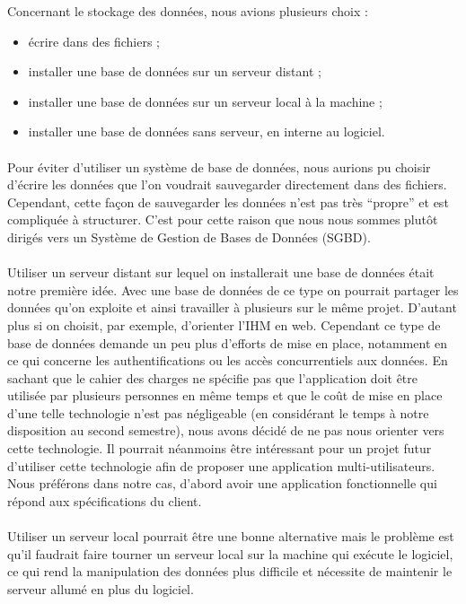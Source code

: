 Concernant le stockage des données, nous avions plusieurs choix :
\begin{itemize}
\item écrire dans des fichiers ;
\item installer une base de données sur un serveur distant ;
\item installer une base de données sur un serveur local à la machine ;
\item installer une base de données sans serveur, en interne au logiciel.
\end{itemize}

\paragraph{}
Pour éviter d’utiliser un système de base de données, nous aurions pu choisir
d’écrire les données que l’on voudrait sauvegarder directement dans des
fichiers. Cependant, cette façon de sauvegarder les données n’est pas très
“propre” et est compliquée à structurer. C’est pour cette raison que nous nous
sommes plutôt dirigés vers un Système de Gestion de Bases de Données (SGBD).

\paragraph{}
Utiliser un serveur distant sur lequel on installerait une base de données 
était notre première idée. Avec une base de données de ce type on pourrait 
partager les données qu’on exploite et ainsi travailler à plusieurs sur le 
même projet. D’autant plus si on choisit, par exemple, d’orienter l’IHM en
 web. Cependant ce type de base de données demande un peu plus d’efforts 
de mise en place, notamment en ce qui concerne les authentifications ou 
les accès concurrentiels aux données. En sachant que le cahier des charges 
ne spécifie pas que l’application doit être utilisée par plusieurs personnes 
en même temps et que le coût de mise en place d’une telle technologie n’est 
pas négligeable (en considérant le temps à notre disposition au second 
semestre), nous avons décidé de ne pas nous orienter vers cette technologie. 
Il pourrait néanmoins être intéressant pour un projet futur d’utiliser 
cette technologie afin de proposer une application multi-utilisateurs. 
Nous préférons dans notre cas, d’abord avoir une application fonctionnelle 
qui répond aux spécifications du client. 

\paragraph{}
 Utiliser un serveur local pourrait être une bonne alternative mais le problème 
est qu’il faudrait faire tourner un serveur local sur la machine qui exécute 
le logiciel, ce qui rend la manipulation des données plus difficile et
 nécessite de maintenir le serveur allumé en plus du logiciel.

